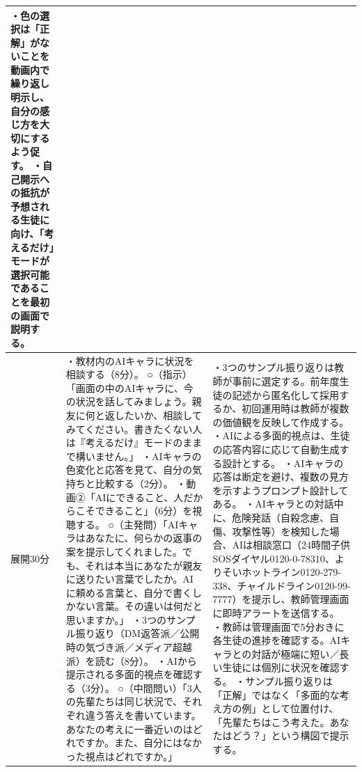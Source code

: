 \documentclass[uplatex,a4paper,11pt]{jsarticle}
\begin{document}
{\begin{longtable}{|>{\centering\arraybackslash}m{14mm}|p{72mm}|p{68mm}|}
    ・色の選択は「正解」がないことを動画内で繰り返し明示し、自分の感じ方を大切にするよう促す。\newline
    ・自己開示への抵抗が予想される生徒に向け、「考えるだけ」モードが選択可能であることを最初の画面で説明する。 \\ \hline
  展開\newline30分 &
    ・教材内のAIキャラに状況を相談する（8分）。\newline
    ○（指示）「画面の中のAIキャラに、今の状況を話してみましょう。親友に何と返したいか、相談してみてください。書きたくない人は『考えるだけ』モードのままで構いません。」\newline
    ・AIキャラの色変化と応答を見て、自分の気持ちと比較する（2分）。\newline
    ・動画②「AIにできること、人だからこそできること」（6分）を視聴する。\newline
    ○（主発問）「AIキャラはあなたに、何らかの返事の案を提示してくれました。でも、それは本当にあなたが親友に送りたい言葉でしたか。AIに頼める言葉と、自分で書くしかない言葉。その違いは何だと思いますか。」\newline
    ・3つのサンプル振り返り（DM返答派／公開時の気づき派／メディア超越派）を読む（8分）。\newline
    ・AIから提示される多面的視点を確認する（3分）。\newline
    ○（中間問い）「3人の先輩たちは同じ状況で、それぞれ違う答えを書いています。あなたの考えに一番近いのはどれですか。また、自分にはなかった視点はどれですか。」&
    ・3つのサンプル振り返りは教師が事前に選定する。前年度生徒の記述から匿名化して採用するか、初回運用時は教師が複数の価値観を反映して作成する。\newline
    ・AIによる多面的視点は、生徒の応答内容に応じて自動生成する設計とする。\newline
    ・AIキャラの応答は断定を避け、複数の見方を示すようプロンプト設計してある。\newline
    ・AIキャラとの対話中に、危険発話（自殺念慮、自傷、攻撃性等）を検知した場合、AIは相談窓口（24時間子供SOSダイヤル0120-0-78310、よりそいホットライン0120-279-338、チャイルドライン0120-99-7777）を提示し、教師管理画面に即時アラートを送信する。\newline
    ・教師は管理画面で5分おきに各生徒の進捗を確認する。AIキャラとの対話が極端に短い／長い生徒には個別に状況を確認する。\newline
    ・サンプル振り返りは「正解」ではなく「多面的な考え方の例」として位置付け、「先輩たちはこう考えた。あなたはどう？」という構図で提示する。\newline

\end{longtable}}
\end{document}
